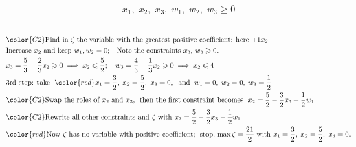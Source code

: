 \documentclass[usenames,dvipsnames,8pt]{beamer}%
\begin{document}
\begin{frame}
\begin{columns}
\begin{column}{0.5\textwidth}
\begin{table}[ht]
      \end{table}
      \vspace{-0.4cm}
      \begin{align*}
        x_1,\;x_2,\;x_3,\;w_1,\;w_2,\;w_3\geqslant 0
      \end{align*}
    \end{column}
  \end{columns}
  \begin{align*}
    &{\color{C2}\text{Find in $\zeta$ the variable with the greatest positive coefficient: here $+1 x_2$}} \\
    &\text{Increase $x_2$ and keep $w_1, w_2 = 0$;\quad Note the constraints $x_3,\,w_3\geqslant 0$.} \\
    &x_3 = \frac{5}{3}-\frac{2}{3}x_2\geqslant 0\;\Longrightarrow\; x_2\leqslant\frac{5}{2};\quad w_3 = \frac{4}{3}-\frac{1}{3}x_2\geqslant 0\;\Longrightarrow\; x_2\leqslant 4\\
    &\text{3rd step: take }\;{\color{red}x_1 = \frac{3}{2},\; x_2 = \frac{5}{2},\; x_3 = 0},\;\text{ and }\;w_1 = 0,\;w_2 = 0,\;w_3 = \frac{1}{2}\\
    &{\color{C2}\text{Swap the roles of $x_2$ and $x_3$,\;\text{ then the first constraint becomes }\;$x_2 = \frac{5}{2} - \frac{3}{2} x_3 - \frac{1}{2} w_1$}} \\
    &{\color{C2}\text{Rewrite all other constraints and $\zeta$ with $x_2 = \frac{5}{2} - \frac{3}{2} x_3 - \frac{1}{2} w_1$}}\\
    &{\color{red}\text{Now $\zeta$ has no variable with positive coefficient;\; stop.\;$\max\zeta = \frac{21}{2}$ with $x_1 = \frac{3}{2},\; x_2 = \frac{5}{2},\; x_3 = 0$.}} 
  \end{align*}
\end{frame}
\end{document}
